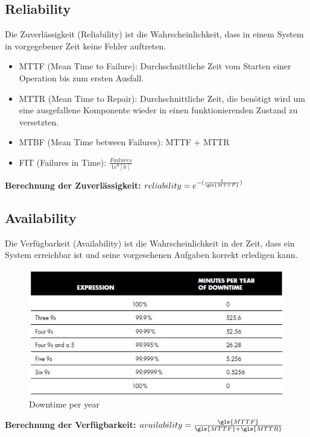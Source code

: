 \subsection{Reliability}

Die Zuverlässigkeit (Reliability) ist die Wahrscheinlichkeit, dass in einem System in vorgegebener Zeit keine Fehler auftreten.

\begin{itemize}
	\item \gls{MTTF} (Mean Time to Failure): Durchschnittliche Zeit vom Starten einer Operation bis zum ersten Ausfall.
	\item \gls{MTTR} (Mean Time to Repair): Durchschnittliche Zeit, die benötigt wird um eine ausgefallene Komponente wieder in einen funktionierenden Zustand zu versetzten.
	\item \gls{MTBF} (Mean Time between Failures): MTTF + MTTR
	\item \gls{FIT} (Failures in Time):  $\frac{Failures}{1e^{9}[h]}$
\end{itemize}

\textbf{Berechnung der Zuverlässigkeit:}
$reliability = e^{-(\frac{1}{\gls{MTTF}})}$

\subsection{Availability}
Die Verfügbarkeit (Availability) ist die Wahrscheinlichkeit in der Zeit, dass ein System erreichbar ist und seine vorgesehenen Aufgaben korrekt erledigen kann.

\begin{figure}[H]
	\centering
	\includegraphics[width=\textwidth]{content/faulttolerance/images/downtime-per-year.jpg}
	\caption{Downtime per year}
\end{figure}

\textbf{Berechnung der Verfügbarkeit:}
$availability = \frac{\gls{MTTF}}{\gls{MTTF} + \gls{MTTR}}$

